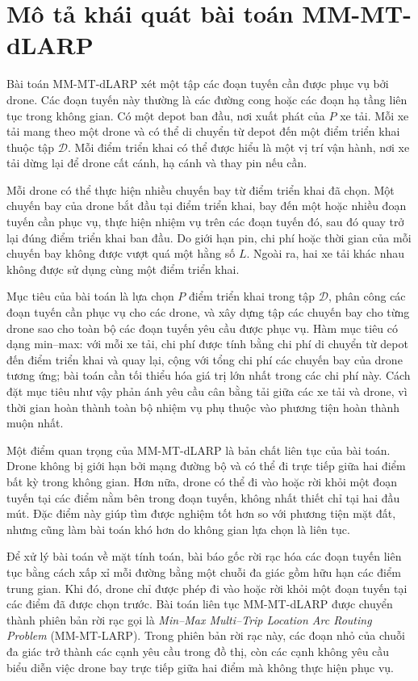 \section{Mô tả khái quát bài toán MM-MT-dLARP}

Bài toán MM-MT-dLARP xét một tập các đoạn tuyến cần được phục vụ bởi drone. Các đoạn tuyến này thường là các đường cong hoặc các đoạn hạ tầng liên tục trong không gian. Có một depot ban đầu, nơi xuất phát của \(P\) xe tải. Mỗi xe tải mang theo một drone và có thể di chuyển từ depot đến một điểm triển khai thuộc tập \(\mathcal{D}\). Mỗi điểm triển khai có thể được hiểu là một vị trí vận hành, nơi xe tải dừng lại để drone cất cánh, hạ cánh và thay pin nếu cần.

Mỗi drone có thể thực hiện nhiều chuyến bay từ điểm triển khai đã chọn. Một chuyến bay của drone bắt đầu tại điểm triển khai, bay đến một hoặc nhiều đoạn tuyến cần phục vụ, thực hiện nhiệm vụ trên các đoạn tuyến đó, sau đó quay trở lại đúng điểm triển khai ban đầu. Do giới hạn pin, chi phí hoặc thời gian của mỗi chuyến bay không được vượt quá một hằng số \(L\). Ngoài ra, hai xe tải khác nhau không được sử dụng cùng một điểm triển khai.

Mục tiêu của bài toán là lựa chọn \(P\) điểm triển khai trong tập \(\mathcal{D}\), phân công các đoạn tuyến cần phục vụ cho các drone, và xây dựng tập các chuyến bay cho từng drone sao cho toàn bộ các đoạn tuyến yêu cầu được phục vụ. Hàm mục tiêu có dạng min--max: với mỗi xe tải, chi phí được tính bằng chi phí di chuyển từ depot đến điểm triển khai và quay lại, cộng với tổng chi phí các chuyến bay của drone tương ứng; bài toán cần tối thiểu hóa giá trị lớn nhất trong các chi phí này. Cách đặt mục tiêu như vậy phản ánh yêu cầu cân bằng tải giữa các xe tải và drone, vì thời gian hoàn thành toàn bộ nhiệm vụ phụ thuộc vào phương tiện hoàn thành muộn nhất.

Một điểm quan trọng của MM-MT-dLARP là bản chất liên tục của bài toán. Drone không bị giới hạn bởi mạng đường bộ và có thể đi trực tiếp giữa hai điểm bất kỳ trong không gian. Hơn nữa, drone có thể đi vào hoặc rời khỏi một đoạn tuyến tại các điểm nằm bên trong đoạn tuyến, không nhất thiết chỉ tại hai đầu mút. Đặc điểm này giúp tìm được nghiệm tốt hơn so với phương tiện mặt đất, nhưng cũng làm bài toán khó hơn do không gian lựa chọn là liên tục.

Để xử lý bài toán về mặt tính toán, bài báo gốc rời rạc hóa các đoạn tuyến liên tục bằng cách xấp xỉ mỗi đường bằng một chuỗi đa giác gồm hữu hạn các điểm trung gian. Khi đó, drone chỉ được phép đi vào hoặc rời khỏi một đoạn tuyến tại các điểm đã được chọn trước. Bài toán liên tục MM-MT-dLARP được chuyển thành phiên bản rời rạc gọi là \textit{Min--Max Multi--Trip Location Arc Routing Problem} (MM-MT-LARP). Trong phiên bản rời rạc này, các đoạn nhỏ của chuỗi đa giác trở thành các cạnh yêu cầu trong đồ thị, còn các cạnh không yêu cầu biểu diễn việc drone bay trực tiếp giữa hai điểm mà không thực hiện phục vụ.

